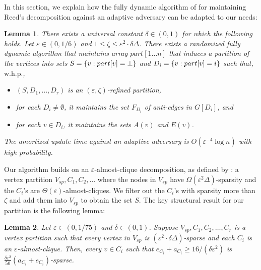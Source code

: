 \documentclass[a4paper,english,11pt]{amsart}
\newtheorem{lemma}{Lemma}[section]
\theoremstyle{definition}
\renewcommand{\leq}{\leqslant}
\renewcommand{\geq}{\geqslant}
\DeclarePairedDelimiter{\set}{\{}{\}}
\newcommand{\eps}{\varepsilon}
\newcommand{\whp}{$\text{w.h.p.}$\xspace}
\newcommand{\Vsparse}{V_{sp}}
\begin{document}
In this section, we explain how the fully dynamic algorithm of \cite{BRW24} for maintaining Reed's decomposition against an adaptive adversary can be adapted to our needs:
\begin{lemma}
    \label{prop:refined-part}
    There exists a universal constant $\delta \in (0,1)$ for which the following holds. Let $\eps \in (0, 1/6)$ and $1 \leq \zeta \leq \eps^2 \cdot \delta \Delta$.
    There exists a randomized fully dynamic algorithm that maintains array $part[1 \ldots n]$ that induces a partition of the vertices into sets $S = \set{ v : part[v] = \bot}$ and $D_i = \set{v :  part[v] = i}$ such that, \whp,
    \begin{itemize}
    \item $(S, D_1, \ldots, D_r)$ is an $(\eps,\zeta)$-refined partition,
\item for each $D_i \neq \emptyset$, it maintains the set $F_{D_i}$ of anti-edges in $G[D_i]$, and
    \item for each $v\in D_i$, it maintains the sets $A(v)$ and $E(v)$.
    \end{itemize}
    The amortized update time against an adaptive adversary is $O(\eps^{-4}\log n)$ with high probability.
\end{lemma}


Our algorithm builds on an $\eps$-almost-clique decomposition, as defined by \cite{ACK19}: a vertex partition $\Vsparse, C_1, C_2, \ldots$
where the nodes in $\Vsparse$ have $\Omega(\eps^2 \Delta)$-sparsity and the $C_i$'s are $\Theta( \eps )$-almost-cliques. We filter out the $C_i$'s with sparsity more than $\zeta$ and add them into $\Vsparse$ to obtain the set $S$.
The key structural result for our partition is the following lemma:



\begin{lemma}
    \label{lem:dense-ext-sparsity}
    Let $\eps \in (0,1/75)$ and $\delta \in (0,1)$.
    Suppose $\Vsparse, C_1, C_2, \ldots, C_r$ is a vertex partition such that every vertex in $\Vsparse$ is $( \eps^2 \cdot \delta\Delta )$-sparse and each $C_i$ is an $\eps$-almost-clique. Then, every $v\in C_i$ such that $e_{C_i} + a_{C_i} \geq 16/(\delta\eps^2)$ is $\frac{\delta \eps^2}{50} ( a_{C_i} + e_{C_i} )$-sparse.
\end{lemma}
\end{document}
